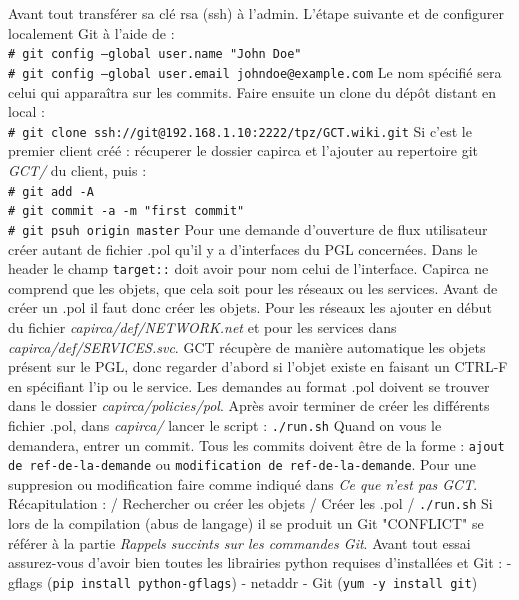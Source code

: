 \documentclass{article}
\newcommand{\shellcmdd}[1]{\\\indent\indent\texttt{\footnotesize\# #1}}
\begin{document}
      \noindent Avant tout transférer sa clé rsa (ssh) à l'admin. L'étape suivante et de configurer localement Git à l'aide de : \shellcmdd{git config --global user.name "John Doe"}
      \shellcmdd{git config --global user.email johndoe@example.com}\smallbreak
      \noindent Le nom spécifié sera celui qui apparaîtra sur les commits.
      \noindent Faire ensuite un clone du dépôt distant en local : \shellcmdd{git clone ssh://git@192.168.1.10:2222/tpz/GCT.wiki.git} \smallbreak
      \noindent Si c'est le premier client créé : récuperer le dossier capirca et l'ajouter au repertoire git \textit{GCT/} du client, puis :
      \shellcmdd{git add -A}
      \shellcmdd{git commit -a -m "first commit"}\smallbreak
      \shellcmdd{git psuh origin master}\smallbreak
      \noindent Pour une demande d'ouverture de flux utilisateur créer autant de fichier .pol qu'il y a d'interfaces du PGL concernées.
      Dans le header le champ \texttt{target::} doit avoir pour nom celui de l'interface.
      Capirca ne comprend que les objets, que cela soit pour les réseaux ou les services.
      Avant de créer un .pol il faut donc créer les objets. Pour les réseaux les ajouter en début du fichier \textit{capirca/def/NETWORK.net}
      et pour les services dans \textit{capirca/def/SERVICES.svc}. GCT récupère de manière automatique les objets présent
      sur le PGL, donc regarder d'abord si l'objet existe en faisant un CTRL-F en spécifiant l'ip ou le service.
      Les demandes au format .pol doivent se trouver dans le dossier \textit{capirca/policies/pol}.
      Après avoir terminer de créer les différents fichier .pol, dans \textit{capirca/} lancer le script  : \texttt{./run.sh} \smallbreak
      \noindent Quand on vous le demandera, entrer un commit. Tous les commits doivent être de la forme : \texttt{ajout de ref-de-la-demande} ou
      \texttt{modification de ref-de-la-demande}. Pour une suppresion ou modification faire comme indiqué dans \textit{Ce que n'est pas GCT}.
      \bigbreak Récapitulation : / Rechercher ou créer les objets / Créer les .pol / \texttt{./run.sh} \bigbreak
      \noindent Si lors de la compilation (abus de langage) il se produit un Git "CONFLICT" se référer à la partie \textit{Rappels succints
      sur les commandes Git}.
      Avant tout essai assurez-vous d'avoir bien toutes les librairies python requises d'installées et Git : \smallbreak
      - gflags (\texttt{pip install python-gflags}) \smallbreak
      - netaddr \smallbreak
      - Git (\texttt{yum -y install git})
\end{document}
